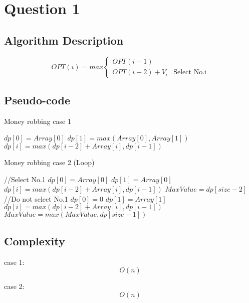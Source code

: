 \section{Question 1}
\subsection{Algorithm Description}

$$OPT(i)=max
	\begin{cases}
		OPT(i-1)     & \text{}            \\
		OPT(i-2)+V_i & \text{Select No.i}
	\end{cases}$$

\subsection{Pseudo-code}

\begin{breakablealgorithm}
	\caption{Money robbing case 1}
	\begin{algorithmic}[1] %
		\State $dp[0]=Array[0]$
		\State $dp[1]=max(Array[0],Array[1])$
		\State $dp[i]=max(dp[i-2]+Array[i],dp[i-1])$
		\EndFor
		\State {}
		\EndFunction
	\end{algorithmic}
\end{breakablealgorithm}

\begin{breakablealgorithm}
	\caption{Money robbing case 2 (Loop)}
	\begin{algorithmic}[1] %
		\State //Select No.1
		\State $dp[0]=Array[0]$
		\State $dp[1]=Array[0]$
		\State $dp[i]=max(dp[i-2]+Array[i],dp[i-1])$
		\EndFor
		\State $MaxValue=dp[size-2]$
		\newpage
		\State //Do not select No.1
		\State $dp[0]=0$
		\State $dp[1]=Array[1]$
		\State $dp[i]=max(dp[i-2]+Array[i],dp[i-1])$
		\EndFor
		\State $MaxValue=max(MaxValue,dp[size-1])$
		\State {}
		\EndFunction
	\end{algorithmic}
\end{breakablealgorithm}

\subsection{Complexity}
case 1:
$$O(n)$$
\par
case 2:
$$O(n)$$
